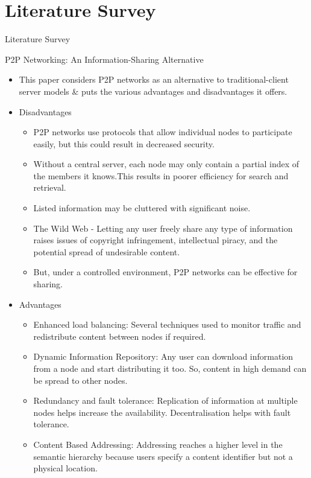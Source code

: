 \documentclass[9pt]{beamer}
\begin{document}
\section{Literature Survey}
\begin{frame}{}
    \large Literature Survey
\end{frame}
\begin{frame}{P2P Networking: An Information-Sharing Alternative}
\begin{itemize}
     \item This paper considers P2P networks as an alternative to traditional-client server models & puts the various advantages and disadvantages it offers. 

\item Disadvantages
\begin{itemize}
   \item P2P networks use protocols that allow individual nodes to participate easily, but this could result in decreased security. 
\item Without a central server, each node may only contain a partial index of the members it knows.This results in poorer efficiency for search and retrieval. 
\item Listed information may be cluttered with significant noise.
\item The Wild Web - Letting any user freely share any type of information raises issues of copyright infringement, intellectual piracy, and the potential spread of undesirable content.

\item But, under a controlled environment, P2P networks can be effective for sharing.
\end{itemize}

\end{itemize}
\end{frame}

\begin{frame}{}
\begin{itemize}
    \item Advantages

\begin{itemize}
    \item Enhanced load balancing:
Several techniques used to monitor traffic and redistribute content between nodes if required. 
\item Dynamic Information Repository:
Any user can download information from a node and start distributing it too. So, content in high demand can be spread to other nodes. 
\item Redundancy and fault tolerance:
Replication of information at multiple nodes helps increase the availability. Decentralisation helps with fault tolerance. 
\item Content Based Addressing:
Addressing reaches a higher level in the semantic hierarchy because users specify a content identifier but not a physical location.
\end{itemize}
\end{itemize}
    
\end{frame}
\end{document}

